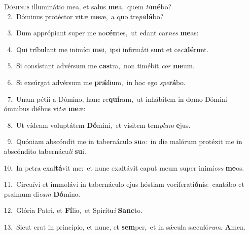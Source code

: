 \lettrine{\initial\textcolor{\initialcolor}{D}}{óminus} illuminátio mea, et salus \textbf{me}\-a,~\star quem \textit{ti}\-\textbf{mé}bo?\\
{\numbfont\textcolor{\numbcolor}{~2.}}~Dóminus protéctor vitæ \textbf{me}\-æ,~\star a quo tre\-\textit{pi}\-\textbf{dá}bo?\par
{\numbfont\textcolor{\numbcolor}{~3.}}~Dum apprópiant super me no\-\textbf{cén}\-tes,~\star ut edant car\textit{nes} \textbf{me}\-as:\par
{\numbfont\textcolor{\numbcolor}{~4.}}~Qui tríbulant me inimíci \textbf{me}\-i,~\star ipsi infirmáti sunt et ce\-\textit{ci}\-\textbf{dé}runt.\par
{\numbfont\textcolor{\numbcolor}{~5.}}~Si consístant advérsum me \textbf{cas}\-tra,~\star non timébit \textit{cor} \textbf{me}\-um.\par
{\numbfont\textcolor{\numbcolor}{~6.}}~Si exsúrgat advérsum me \textbf{prǽ}\-lium,~\star in hoc ego \textit{spe}\-\textbf{rá}bo.\par
{\numbfont\textcolor{\numbcolor}{~7.}}~Unam pétii a Dómino, hanc re\-\textbf{quí}\-ram,~\star ut inhábitem in domo Dómini ómnibus diébus vi\textit{tæ} \textbf{me}\-æ:\par
{\numbfont\textcolor{\numbcolor}{~8.}}~Ut vídeam voluptátem \textbf{Dó}\-mini,~\star et vísitem tem\textit{plum} \textbf{e}\-jus.\par
{\numbfont\textcolor{\numbcolor}{~9.}}~Quóniam abscóndit me in tabernáculo \textbf{su}\-o:~\star in die malórum protéxit me in abscóndito tabernácu\textit{li} \textbf{su}\-i.\par
{\numbfont\textcolor{\numbcolor}{10.}}~In petra exal\-\textbf{tá}\-vit me:~\star et nunc exaltávit caput meum super inimí\textit{cos} \textbf{me}\-os.\par
{\numbfont\textcolor{\numbcolor}{11.}}~Circuívi et immolávi in tabernáculo ejus hóstiam vociferati\-\textbf{ó}\-nis:~\star cantábo et psalmum di\textit{cam} \textbf{Dó}\-mino.\par
{\numbfont\textcolor{\numbcolor}{12.}}~Glória Patri, et \textbf{Fí}\-lio,~\star et Spirítu\textit{i} \textbf{Sanc}\-to.\par
{\numbfont\textcolor{\numbcolor}{13.}}~Sicut erat in princípio, et nunc, et \textbf{sem}\-per,~\star et in sǽcula sæculó\-\textit{rum}\-. \textbf{A}\-men.\par

